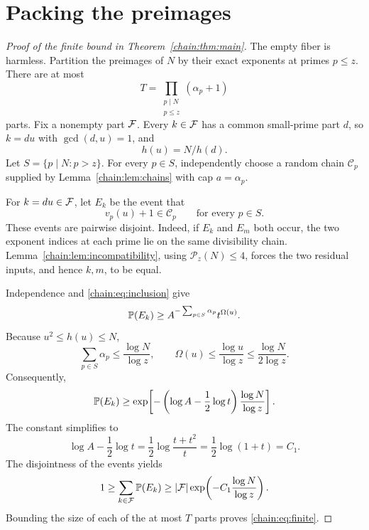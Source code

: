 \section{Packing the preimages}
\begin{proof}[Proof of the finite bound in Theorem~\ref{chain:thm:main}]
The empty fiber is harmless. Partition the preimages of $N$ by their exact exponents at primes $p\le z$. There are at most
\[
T=\prod_{\substack{p\mid N\\p\le z}}(\alpha_p+1)
\]
parts. Fix a nonempty part $\mathcal F$. Every $k\in\mathcal F$ has a common small-prime part $d$, so $k=du$ with $\gcd(d,u)=1$, and
\[
h(u)=N/h(d).
\]
Let $S=\{p\mid N:p>z\}$. For every $p\in S$, independently choose a random chain $\mathcal C_p$ supplied by Lemma~\ref{chain:lem:chains} with cap $a=\alpha_p$.

For $k=du\in\mathcal F$, let $E_k$ be the event that
\[
v_p(u)+1\in\mathcal C_p\qquad\text{for every }p\in S.
\]
These events are pairwise disjoint. Indeed, if $E_k$ and $E_m$ both occur, the two exponent indices at each prime lie on the same divisibility chain. Lemma~\ref{chain:lem:incompatibility}, using $\mathcal P_z(N)\le4$, forces the two residual inputs, and hence $k,m$, to be equal.

Independence and \eqref{chain:eq:inclusion} give
\[
\mathbb P(E_k)\ge A^{-\sum_{p\in S}\alpha_p}t^{\Omega(u)}.
\]
Because $u^2\le h(u)\le N$,
\[
\sum_{p\in S}\alpha_p\le\frac{\log N}{\log z},
\qquad
\Omega(u)\le\frac{\log u}{\log z}\le\frac{\log N}{2\log z}.
\]
Consequently,
\[
\mathbb P(E_k)\ge\exp\!\left[-\left(\log A-\frac12\log t\right)
\frac{\log N}{\log z}\right].
\]
The constant simplifies to
\[
\log A-\frac12\log t
=\frac12\log\frac{t+t^2}{t}
=\frac12\log(1+t)=C_1.
\]
The disjointness of the events yields
\[
1\ge\sum_{k\in\mathcal F}\mathbb P(E_k)
\ge |\mathcal F|\exp\!\left(-C_1\frac{\log N}{\log z}\right).
\]
Bounding the size of each of the at most $T$ parts proves \eqref{chain:eq:finite}.
\end{proof}


